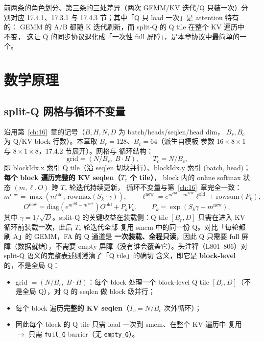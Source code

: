 前两条的角色划分、第三条的三处差异（两次 GEMM/KV 迭代/Q 只装一次）分别对应
17.4.1、17.3.1 与 17.4.3 节；其中「Q 只 load 一次」是 attention 特有的：
GEMM 的 A/B 都随 K 迭代刷新，而 split-Q 的 Q tile 在整个 KV 遍历中不变，
这让 Q 的同步协议退化成「一次性 full 屏障」，是本章协议中最简单的一个。

\section{数学原理}

\subsection{split-Q 网格与循环不变量}

沿用第~\ref{ch:16}~章的记号（$B, H, N, D$ 为 batch/heads/seqlen/head dim，
$B_r, B_c$ 为 Q/KV block 行数）。本章取 $B_r = 128$、$B_c = 64$（派生自模板
参数 $16 \times 8 \times 1$ 与 $8 \times 1 \times 8$，17.4.2 节展开）。网格与
循环结构：
\begin{equation}
  \text{grid} = (N / B_r,\; B \cdot H), \qquad
  T_c = N / B_c ,
  \label{eq:17-grid}
\end{equation}
即 blockIdx.x 索引 Q tile（沿 seqlen 切块并行）、blockIdx.y 索引
(batch, head)；\textbf{每个 block 遍历完整的 KV seqlen（$T_c$ 个 tile）}，
block 内的 online softmax 状态 $(m, \ell, O)$ 跨 $T_c$ 轮迭代持续更新，
循环不变量与第~\ref{ch:16}~章完全一致：
\begin{equation}
  m^{\text{new}} = \max(m^{\text{old}},\, \mathrm{rowmax}(S_k \cdot \gamma)),
  \qquad
  \ell^{\text{new}} = e^{m^{\text{old}} - m^{\text{new}}} \ell^{\text{old}}
    + \mathrm{rowsum}(P_k),
  \label{eq:17-online}
\end{equation}
\begin{equation}
  O^{\text{new}} = \mathrm{diag}\!\left(e^{m^{\text{old}} - m^{\text{new}}}\right)
  O^{\text{old}} + P_k V_k, \qquad
  P_k = \exp(S_k \gamma - m^{\text{new}}),
  \label{eq:17-rescale}
\end{equation}
其中 $\gamma = 1/\sqrt{D}$。split-Q 的关键收益在装载侧：Q tile
$[B_r, D]$ 只需在进入 KV 循环前装载\textbf{一次}，此后 $T_c$ 轮迭代全部
复用 smem 中的同一份 Q。对比「每轮都刷 A」的 GEMM，FA 的 Q 通道是
\textbf{一次装载、全程只读}，因此 Q 只需要 full 屏障（数据就绪），不需要
empty 屏障（没有谁会覆盖它）。头注释（L801--806）对 split-Q 语义的完整表述则澄清了「Q tile」的确切
含义，即它是 \textbf{block-level} 的，不是全局 Q：

\begin{itemize}
  \item grid $= (N/B_r,\; B \cdot H)$：每个 block 处理一个 block-level Q
        tile $[B_r, D]$（不是全局 Q），对 Q 的 seqlen 做 block 级并行；
  \item 每个 block 遍历\textbf{完整的 KV seqlen}（$T_c = N/B_c$ 次外循环）；
  \item 因此每个 block 的 Q tile 只需 load 一次到 smem、在整个 KV 遍历中
        复用 $\to$ 只需 \texttt{full\_Q} barrier（无 \texttt{empty\_Q}）。
\end{itemize}

